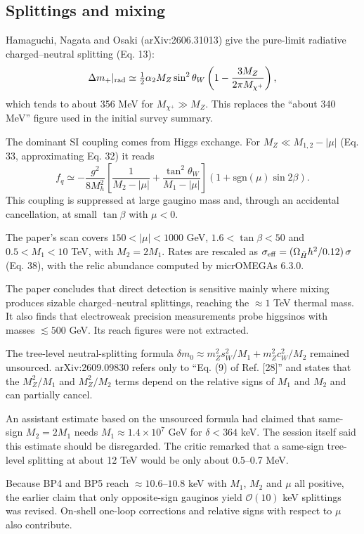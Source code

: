 \documentclass[11pt,a4paper]{article}
\begin{document}
\subsection{Splittings and mixing}
Hamaguchi, Nagata and Osaki (arXiv:2606.31013) give the pure-limit radiative charged--neutral splitting (Eq. 13):
\begin{equation}
\Delta m_+|_{\rm rad} \simeq \tfrac12\alpha_2 M_Z \sin^2\theta_W\left(1-\frac{3M_Z}{2\pi M_{\chi^+}}\right),
\end{equation}
which tends to about 356 MeV for $M_{\chi^+}\gg M_Z$. This replaces the ``about 340 MeV'' figure used in the initial survey summary.

The dominant SI coupling comes from Higgs exchange. For $M_Z\ll M_{1,2}-|\mu|$ (Eq. 33, approximating Eq. 32) it reads
\begin{equation}
f_q \simeq -\frac{g^2}{8M_h^2}\left[\frac{1}{M_2-|\mu|}+\frac{\tan^2\theta_W}{M_1-|\mu|}\right](1+\mathrm{sgn}(\mu)\sin2\beta).
\end{equation}
This coupling is suppressed at large gaugino mass and, through an accidental cancellation, at small $\tan\beta$ with $\mu<0$.

The paper's scan covers $150 < |\mu| < 1000$ GeV, $1.6<\tan\beta<50$ and $0.5<M_1<10$ TeV, with $M_2 = 2M_1$. Rates are rescaled as $\sigma_{\rm eff} = (\Omega_{\tilde H}h^2/0.12)\,\sigma$ (Eq. 38), with the relic abundance computed by micrOMEGAs 6.3.0.

The paper concludes that direct detection is sensitive mainly where mixing produces sizable charged--neutral splittings, reaching the $\approx1$ TeV thermal mass. It also finds that electroweak precision measurements probe higgsinos with masses $\lesssim 500$ GeV. Its reach figures were not extracted.

The tree-level neutral-splitting formula $\delta m_0 \approx m_Z^2 s_W^2/M_1 + m_Z^2 c_W^2/M_2$ remained unsourced. arXiv:2609.09830 refers only to ``Eq. (9) of Ref. [28]'' and states that the $M_Z^2/M_1$ and $M_Z^2/M_2$ terms depend on the relative signs of $M_1$ and $M_2$ and can partially cancel.

An assistant estimate based on the unsourced formula had claimed that same-sign $M_2 = 2M_1$ needs $M_1\approx1.4\times10^7$ GeV for $\delta<364$ keV. The session itself said this estimate should be disregarded. The critic remarked that a same-sign tree-level splitting at about 12 TeV would be only about 0.5--0.7 MeV.

Because BP4 and BP5 reach $\approx 10.6$--$10.8$ keV with $M_1$, $M_2$ and $\mu$ all positive, the earlier claim that only opposite-sign gauginos yield $\mathcal{O}(10)$ keV splittings was revised. On-shell one-loop corrections and relative signs with respect to $\mu$ also contribute.
\end{document}
